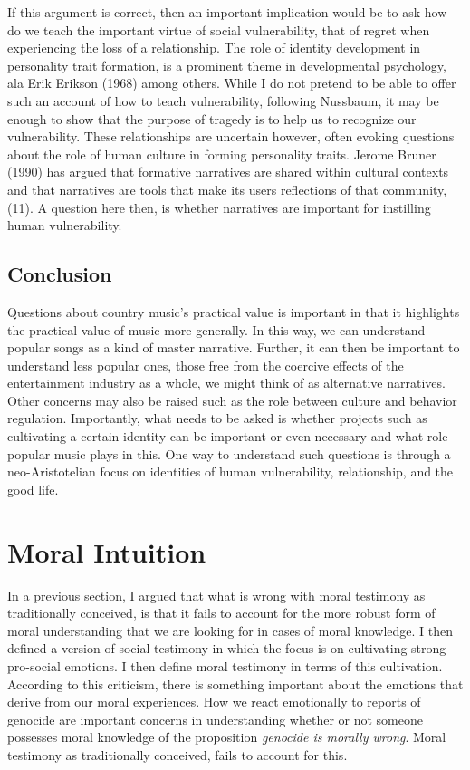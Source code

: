\documentclass[
  letterpaper,
  DIV=11,
  numbers=noendperiod]{scrartcl}
\theoremstyle{remark}
\begin{document}
If this argument is correct, then an important implication would be to
ask how do we teach the important virtue of social vulnerability, that
of regret when experiencing the loss of a relationship. The role of
identity development in personality trait formation, is a prominent
theme in developmental psychology, ala Erik Erikson (1968) among others.
While I do not pretend to be able to offer such an account of how to
teach vulnerability, following Nussbaum, it may be enough to show that
the purpose of tragedy is to help us to recognize our vulnerability.
These relationships are uncertain however, often evoking questions about
the role of human culture in forming personality traits. Jerome Bruner
(1990) has argued that formative narratives are shared within cultural
contexts and that narratives are tools that make its users reflections
of that community, (11). A question here then, is whether narratives are
important for instilling human vulnerability.

\subsection{Conclusion}\label{conclusion}

Questions about country music's practical value is important in that it
highlights the practical value of music more generally. In this way, we
can understand popular songs as a kind of master narrative. Further, it
can then be important to understand less popular ones, those free from
the coercive effects of the entertainment industry as a whole, we might
think of as alternative narratives. Other concerns may also be raised
such as the role between culture and behavior regulation. Importantly,
what needs to be asked is whether projects such as cultivating a certain
identity can be important or even necessary and what role popular music
plays in this. One way to understand such questions is through a
neo-Aristotelian focus on identities of human vulnerability,
relationship, and the good life.

\section{Moral Intuition}\label{moral-intuition}

In a previous section, I argued that what is wrong with moral testimony
as traditionally conceived, is that it fails to account for the more
robust form of moral understanding that we are looking for in cases of
moral knowledge. I then defined a version of social testimony in which
the focus is on cultivating strong pro-social emotions. I then define
moral testimony in terms of this cultivation. According to this
criticism, there is something important about the emotions that derive
from our moral experiences. How we react emotionally to reports of
genocide are important concerns in understanding whether or not someone
possesses moral knowledge of the proposition \emph{genocide is morally
wrong}. Moral testimony as traditionally conceived, fails to account for
this.
\end{document}
